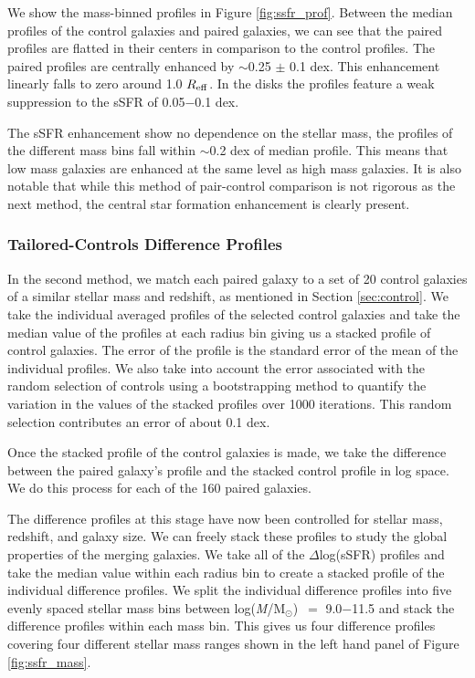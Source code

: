 \documentclass[iop,revtex4,twocolumn,apj,numberedappendix,appendixfloats]{emulateapj}
\newcommand{\reff}{$R_{\rm eff}$}
\newcommand{\logm}{log({\it M}/M$_{\odot}$)}
\begin{document}
We show the mass-binned profiles in Figure \ref{fig:ssfr_prof}. Between the median profiles of the control galaxies and paired galaxies, we can see that the paired profiles are flatted in their centers in comparison to the control profiles. The paired profiles are centrally enhanced by $\sim$0.25 $\pm$ 0.1 dex. This enhancement linearly falls to zero around 1.0 \reff. In the disks the profiles feature a weak suppression to the sSFR of 0.05$-$0.1 dex. 

The sSFR enhancement show no dependence on the stellar mass, the profiles of the different mass bins fall within $\sim$0.2 dex of median profile. This means that low mass galaxies are enhanced at the same level as high mass galaxies. It is also notable that while this method of pair-control comparison is not rigorous as the next method, the central star formation enhancement is clearly present.

\subsubsection{Tailored-Controls Difference Profiles}\label{sec:tailored}

In the second method, we match each paired galaxy to a set of 20 control galaxies of a similar stellar mass and redshift, as mentioned in Section \ref{sec:control}. We take the individual averaged profiles of the selected control galaxies and take the median value of the profiles at each radius bin giving us a stacked profile of control galaxies. The error of the profile is the standard error of the mean of the individual profiles. We also take into account the error associated with the random selection of controls using a bootstrapping method to quantify the variation in the values of the stacked profiles over 1000 iterations. This random selection contributes an error of about 0.1 dex.

Once the stacked profile of the control galaxies is made, we take the difference between the paired galaxy's profile and the stacked control profile in log space. We do this process for each of the 160 paired galaxies. 

The difference profiles at this stage have now been controlled for stellar mass, redshift, and galaxy size. We can freely stack these profiles to study the global properties of the merging galaxies. We take all of the $\Delta$log(sSFR) profiles and take the median value within each radius bin to create a stacked profile of the individual difference profiles. We split the individual difference profiles into five evenly spaced stellar mass bins between \logm\ $=$ 9.0$-$11.5 and stack the difference profiles within each mass bin. This gives us four difference profiles covering four different stellar mass ranges shown in the left hand panel of Figure \ref{fig:ssfr_mass}. 
\end{document}
